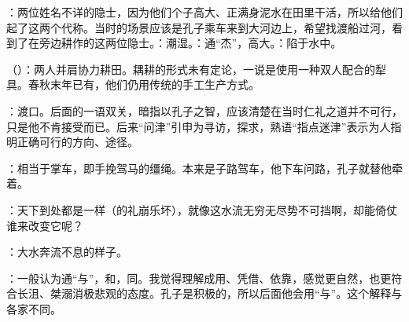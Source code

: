 {
\item {}：两位姓名不详的隐士，因为他们个子高大、正满身泥水在田里干活，所以给他们起了这两个代称。当时的场景应该是孔子乘车来到大河边上，希望找渡船过河，看到了在旁边耕作的这两位隐士。：潮湿。：通“杰”，高大。：陷于水中。

\item {}（）：两人并肩协力耕田。耦耕的形式未有定论，一说是使用一种双人配合的犁具。春秋末年已有，他们仍用传统的手工生产方式。

\item {}：渡口。后面的一语双关，暗指以孔子之智，应该清楚在当时仁礼之道并不可行，只是他不肯接受而已。后来“问津”引申为寻访，探求，熟语“指点迷津”表示为人指明正确可行的方向、途径。

\item {}：相当于掌车，即手挽驾马的缰绳。本来是子路驾车，他下车问路，孔子就替他牵着。

\item {}：天下到处都是一样（的礼崩乐坏），就像这水流无穷无尽势不可挡啊，却能倚仗谁来改变它呢？

：大水奔流不息的样子。

：一般认为通“与”，和，同。我觉得理解成用、凭借、依靠，感觉更自然，也更符合长沮、桀溺消极悲观的态度。孔子是积极的，所以后面他会用“与”。这个解释与各家不同。

}
